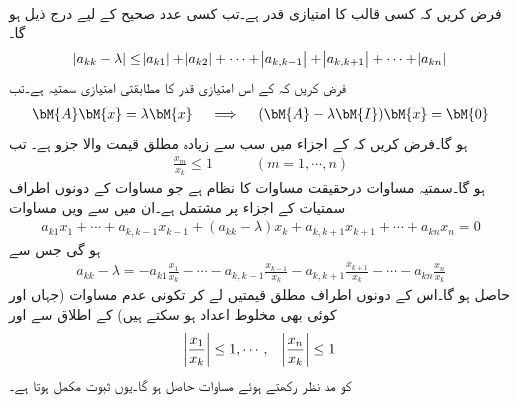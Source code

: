 \quad {}\\
فرض کریں کہ کسی  قالب  کا امتیازی قدر  ہے۔تب کسی عدد صحیح  کے لیے درج ذیل ہو گا۔
\begin{align}\label{مساوات_خطی_اعدادی_گرشگرین_پ}
\abs{a_{kk}-\lambda}\le \abs{a_{k1}}+\abs{a_{k2}}+\cdots+\abs{a_{k,k-1}}+\abs{a_{k,k+1}}+\cdots+\abs{a_{kn}}
\end{align}
\quad
فرض کریں کہ  کے اس امتیازی قدر  کا مطابقتی امتیازی سمتیہ  ہے۔تب
\begin{align}\label{مساوات_خطی_اعدادی_گرشگرین_ٹ}
\bM{A}\bM{x}=\lambda\bM{x}\quad \implies \quad (\bM{A}-\lambda \bM{I})\bM{x}=\bM{0}
\end{align}
ہو گا۔فرض کریں کہ  کے اجزاء میں سب سے زیادہ مطلق قیمت والا جزو  ہے۔ تب
\begin{align*}
\tfrac{x_m}{x_k}\le 1\quad \quad \quad  (m=1,\cdots, n)
\end{align*}
ہو گا۔سمتیہ  مساوات  درحقیقت  مساوات کا نظام ہے جو مساوات کے دونوں اطراف سمتیات کے  اجزاء پر مشتمل ہے۔ان میں سے  ویں مساوات
\begin{align*}
a_{k1}x_1+\cdots+a_{k,k-1}x_{k-1}+(a_{kk}-\lambda)x_k+a_{k,k+1}x_{k+1}+\cdots+a_{kn}x_n=0
\end{align*}
ہو گی جس سے 
\begin{align*}
a_{kk}-\lambda=-a_{k1}\frac{x_1}{x_k}-\cdots-a_{k,k-1}\frac{x_{k-1}}{x_k}-a_{k,k+1}\frac{x_{k+1}}{x_k}-\cdots-a_{kn}\frac{x_{n}}{x_k}
\end{align*}
حاصل ہو گا۔اس کے دونوں اطراف مطلق قیمتیں لے کر تکونی عدم مساوات  (جہاں  اور  کوئی بھی مخلوط اعداد ہو سکتے ہیں) کے اطلاق سے اور
\begin{align*}
\abs{\frac{x_1}{x_k}}\le 1,\cdots, \quad \abs{\frac{x_n}{x_k}}\le 1
\end{align*}
 کو مد نظر رکھتے ہوئے  مساوات  حاصل ہو گا۔یوں ثبوت مکمل ہوتا ہے۔

